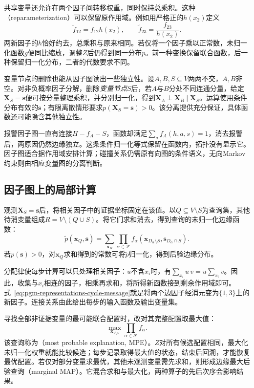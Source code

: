 共享变量还允许在两个因子间转移权重，同时保持总乘积。这种（reparameterization）可以保留原作用域。例如用严格正的$h(x_2)$定义
\[
  \widetilde f_{12}=f_{12}h(x_2),\qquad
  \widetilde f_{23}=\frac{f_{23}}{h(x_2)}.
\]
两新因子的$h$恰好约去，总乘积与原来相同。若仅将一个因子乘以正常数，未归一化函数$g$便同比缩放，调整$Z$后仍得到同一分布$p$。前一种变换保留联合函数，后一种保留归一化分布，二者的代数要求不同。

变量节点的删除也能从因子图读出一些独立性。设$A,B,S\subseteq V$两两不交，$A,B$非空。对非负概率因子分解，删除\emph{变量节点}$S$后，若$A$与$B$分处不同连通分量，给定$\bm{X}_S=\bm{s}$便可按分量整理乘积，并分别归一化，得到$\bm{X}_A\perp\bm{X}_B\mid\bm{X}_S$。运算使用条件分布有效的$\bm{s}$；有限离散情形要求$p(\bm{X}_S=\bm{s})>0$。该分离提供充分保证，具体函数还可能隐含其他独立性。

报警因子图一直有连接$H-f_A-S$，函数却满足$\sum_a f_A(h,a,s)=1$，消去报警后，两原因仍然边缘独立。这条条件归一化等式保留在函数内，拓扑没有显示它。因子图适合据作用域安排计算；碰撞关系仍需原有向图的条件语义，无向Markov约束则由相应变量图的分离判断。

\subsection{因子图上的局部计算}
\label{sec:pgm-representations-local-computation}

观测$\bm{X}_S=\bm{s}$后，将相关因子中的证据坐标固定在该值。以$Q\subseteq V\setminus S$为查询集，其他待消变量组成$R=V\setminus(Q\cup S)$。将它们求和消去，得到查询的未归一化边缘函数：
\begin{equation}
  \widetilde p(\bm{x}_Q,\bm{s})
  =\sum_{\bm{x}_R}
  \prod_{\alpha\in\mathcal{F}}
  f_\alpha(\bm{x}_{D_\alpha\setminus S},\bm{s}_{D_\alpha\cap S}).
  \label{eq:pgm-representations-marginal-query}
\end{equation}
若$p(\bm{s})>0$，对$\bm{x}_Q$求和得到的常数可将$\widetilde p$归一化，得到后验边缘分布。

分配律使每步计算可以只处理相关因子：$u$不含$x_i$时，有$\sum_{x_i}u\,v=u\sum_{x_i}v$。因此，收集与$x_i$相连的因子，相乘再求和，将所得新函数接到剩余作用域即可。式~\eqref{eq:pgm-representations-cycle-message}就是将两个边因子经消元变为$\{1,3\}$上的新因子。连接关系由此给出每步的输入函数及输出变量集。

寻找全部非证据变量的最可能联合配置时，改对其完整配置取最大值：
\[
  \max_{\bm{x}_{V\setminus S}}
  \prod_{\alpha\in\mathcal{F}}f_\alpha.
\]
该查询称为（most probable explanation, MPE）。$Z$对所有候选配置相同，最大化未归一化权重就能比较候选；每步记录取得最大值的状态，结束后回溯，才能恢复最优配置。若仅对部分变量求最优，其他未观测变量需先求和，则形成边缘最大后验查询（marginal MAP）。它混合求和与最大化，两种算子的先后次序会影响结果。

